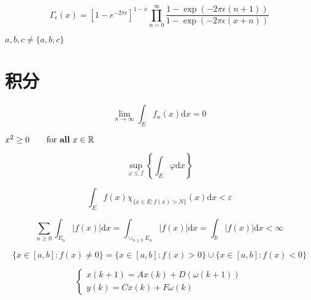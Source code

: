 \documentclass{article}
\begin{document}
    \[
    \Gamma_{\epsilon}(x)=\left[1-e^{-2 \pi \epsilon}\right]^{1-x} \prod_{n=0}^{\infty} \frac{1-\exp (-2 \pi \epsilon(n+1))}{1-\exp (-2 \pi \epsilon(x+n))}
    \]

    ${a,b,c}\neq \{a,b,c\}$ %

    \section{积分}
    \[
    \lim _{n \rightarrow \infty} \int_{E} f_{n}(x) \mathrm{d} x=0
    \]

    $x^{2} \geq 0 \qquad
    \text{for \textbf{all} }
    x\in\mathbb{R}$

    \[
    \sup _{\varphi \leq f}\left\{\int_{E} \varphi \mathrm{d} x\right\}
    \]

    \[
    \int_{E} f(x) \chi_{\{x \in E: f(x)>N\}}(x) \mathrm{d} x<\varepsilon
    \]

    \[
    \sum_{n \geq 0} \int_{E_{n}}|f(x)| \mathrm{d} x=\int_{\cup_{n \geq 0} E_{n}}|f(x)| \mathrm{d} x=\int_{\mathbb{R}}|f(x)| \mathrm{d} x<\infty
    \]
    
    \[
    \{x \in[a, b]: f(x) \neq 0\}=\{x \in[a, b]: f(x)>0\} \cup\{x \in[a, b]: f(x)<0\}
    \]

    \[
    \left\{\begin{array}{ll}
    { x(k+1) = Ax(k) + D(\omega(k+1)) }  \\  %
    { y(k) = Cx(k)+F\omega(k) }
    \end{array}\right.
    \]

    
\end{document}
